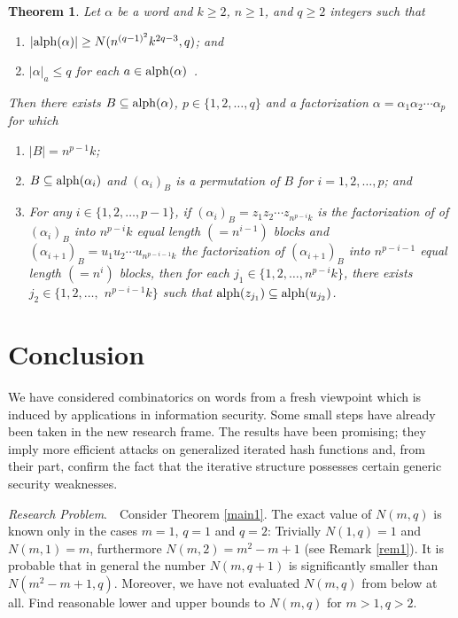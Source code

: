 \documentclass[submission,copyright,creativecommons]{eptcs}
\newcommand{\alp}{{\rm alph}}
\newtheorem{theorem}{Theorem}
\begin{document}
\begin{theorem}\label{main2}
Let $\alpha$ be a word and  $k\ge 2$, $n\ge 1$, and $q\ge 2$ integers such that 
\begin{enumerate}
\item[$(1)$] $|\alp(\alpha)|\ge N(n^{(q-1)^2}k^{2q-3},q)$; and 
\item[\rm{(2)}] $|\alpha|_a\le q$ for each $a\in \alp(\alpha)$\ .
\end{enumerate}
Then there
exists $B\subseteq \alp(\alpha)$, $p\in\{1,2,\ldots,q\}$ and a
factorization $\alpha=\alpha_1\alpha_2\cdots \alpha_p$ for which
\begin{enumerate}
\item[\rm{(3)}] $|B|=n^{p-1}k$; 
\item[\rm{(4)}] $B\subseteq \alp(\alpha_i)$ and $(\alpha_i)_B$ is a permutation of $B$ for
  $i=1,2,\ldots,p$; and
\item[\rm{(5)}] For any $i\in\{1,2,\ldots,p-1\}$, if
  $(\alpha_i)_B=z_1z_2\cdots z_{n^{p-i}k}$ is the factorization of
  of $(\alpha_i)_B$ into $n^{p-i}k$ equal length $(=n^{i-1})$
  blocks and $(\alpha_{i+1})_B=u_1u_2\cdots u_{n^{p-i-1}k}$ the
  factorization of $(\alpha_{i+1})_B$ into $n^{p-i-1}$ equal length
  $(=n^i)$ blocks, then for each $j_1\in\{1,2,\ldots,n^{p-i}k\}$,
  there exists $j_2\in\{1,2,\ldots,$ $n^{p-i-1}k\}$ such that
  $\alp(z_{j_1})\subseteq \alp(u_{j_2})$.
\end{enumerate}
\end{theorem}

\section{Conclusion}

We have considered combinatorics on words from a fresh viewpoint which is induced by applications in information security. Some small steps have already been taken in the new research frame. The results have been promising; they imply more efficient attacks on generalized iterated hash functions and, from their part, confirm the fact that the iterative structure possesses certain generic security weaknesses. 

\medskip

\noindent \textit{Research Problem}.\ \ Consider Theorem \ref{main1}. The exact value of $N(m,q)$ is known only in the cases $m=1$, $q=1$ and $q=2$: Trivially $N(1,q)=1$ and $N(m,1)=m$, furthermore $N(m,2)=m^2-m+1$ (see Remark \ref{rem1}). It is probable that in general the number $N(m,q+1)$ is significantly smaller than $N(m^2-m+1,q)$. Moreover, we have not evaluated $N(m,q)$ from below at all. Find reasonable lower and upper bounds to $N(m,q)$ for $m>1,q>2$.  



\end{document}
